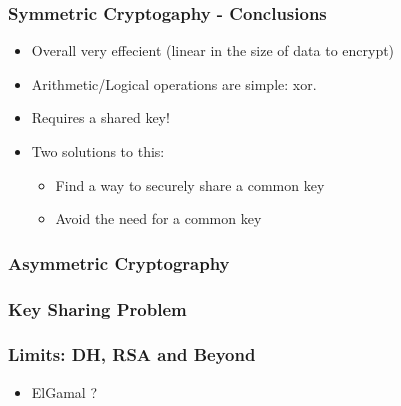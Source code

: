 \documentclass[
hyperref={pdfpagelabels=false}
,xcolor=table
]
{beamer}
\newcommand{\plus}{{\texttt{[image: plus.png]}}}
\newcommand{\minus}{{\texttt{[image: minus.png]}}}
\begin{document}
\begin{frame}
  \frametitle{Symmetric Cryptogaphy - Conclusions}

  \begin{itemize}
  \item[\plus] Overall very effecient (linear in the size of data to encrypt)
  \item[\plus] Arithmetic/Logical operations are simple: xor. 
  \item[\minus] Requires a shared key! 
  \item Two solutions to this:
    \begin{itemize}
    \item Find a way to securely share a common key
    \item Avoid the need for a common key
    \end{itemize}
  \end{itemize}
\end{frame}




\begin{frame}
  \frametitle{Asymmetric Cryptography}
 
\end{frame}

\begin{frame}
  \frametitle{Key Sharing Problem}
\end{frame}



\begin{frame}
  \frametitle{Limits: DH, RSA and Beyond}

  \begin{itemize}
  \item ElGamal ? 
  \end{itemize}
\end{frame}
\end{document}
